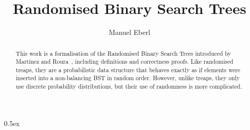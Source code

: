 \documentclass[11pt,a4paper]{article}
\begin{document}
\title{Randomised Binary Search Trees}
\author{Manuel Eberl}
\maketitle

\begin{abstract}
This work is a formalisation of the Randomised Binary Search Trees introduced by Mart\'{i}nez and Roura~\cite{martinez_roura}, including definitions and correctness proofs. Like randomised treaps, they are a probabilistic data structure that behaves exactly as if elements were inserted into a non-balancing BST in random order. However, unlike treaps, they only use discrete probability distributions, but their use of randomness is more complicated.
\end{abstract}

\tableofcontents
\newpage
\parindent 0pt\parskip 0.5ex





\end{document}
